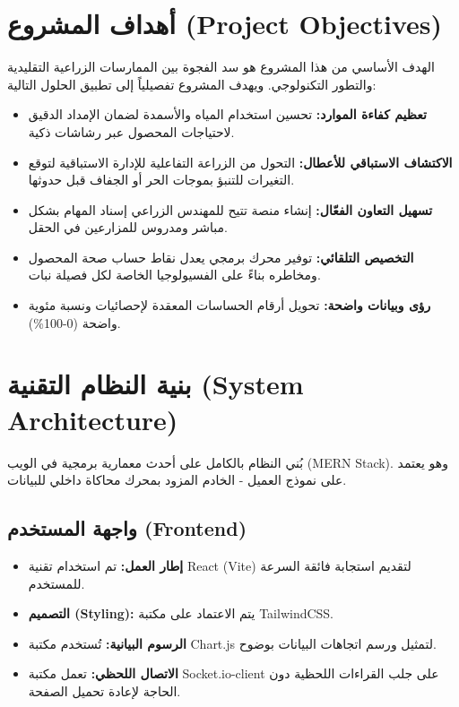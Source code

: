 \documentclass[12pt,a4paper]{article}
\begin{document}
\vspace{0.5cm}

\section{أهداف المشروع (Project Objectives)}
الهدف الأساسي من هذا المشروع هو سد الفجوة بين الممارسات الزراعية التقليدية والتطور التكنولوجي. ويهدف المشروع تفصيلياً إلى تطبيق الحلول التالية:
\begin{itemize}
    \item \textbf{تعظيم كفاءة الموارد:} تحسين استخدام المياه والأسمدة لضمان الإمداد الدقيق لاحتياجات المحصول عبر رشاشات ذكية.
    \item \textbf{الاكتشاف الاستباقي للأعطال:} التحول من الزراعة التفاعلية للإدارة الاستباقية لتوقع التغيرات للتنبؤ بموجات الحر أو الجفاف قبل حدوثها.
    \item \textbf{تسهيل التعاون الفعّال:} إنشاء منصة تتيح للمهندس الزراعي إسناد المهام بشكل مباشر ومدروس للمزارعين في الحقل.
    \item \textbf{التخصيص التلقائي:} توفير محرك برمجي يعدل نقاط حساب صحة المحصول ومخاطره بناءً على الفسيولوجيا الخاصة لكل فصيلة نبات.
    \item \textbf{رؤى وبيانات واضحة:} تحويل أرقام الحساسات المعقدة لإحصائيات ونسبة مئوية واضحة (0-100\%).
\end{itemize}

\vspace{0.5cm}

\section{بنية النظام التقنية (System Architecture)}
بُني النظام بالكامل على أحدث معمارية برمجية في الويب (MERN Stack). وهو يعتمد على نموذج العميل - الخادم المزود بمحرك محاكاة داخلي للبيانات.

\subsection{واجهة المستخدم (Frontend)}
\begin{itemize}
    \item \textbf{إطار العمل:} تم استخدام تقنية React (Vite) لتقديم استجابة فائقة السرعة للمستخدم.
    \item \textbf{التصميم (Styling):} يتم الاعتماد على مكتبة TailwindCSS.
    \item \textbf{الرسوم البيانية:} تُستخدم مكتبة Chart.js لتمثيل ورسم اتجاهات البيانات بوضوح.
    \item \textbf{الاتصال اللحظي:} تعمل مكتبة Socket.io-client على جلب القراءات اللحظية دون الحاجة لإعادة تحميل الصفحة.
\end{itemize}
\end{document}

